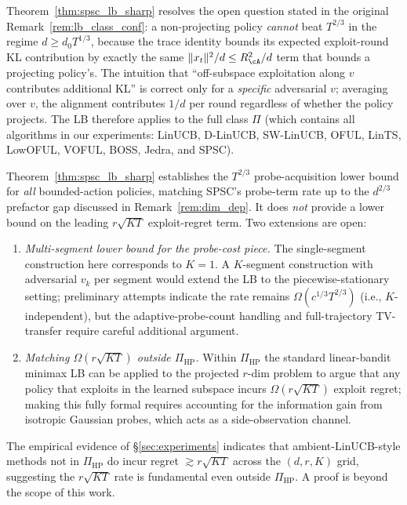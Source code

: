 \begin{remark}
\label{rem:lb_class_resolved}
Theorem~\ref{thm:spsc_lb_sharp} resolves the open question stated in
the original Remark~\ref{rem:lb_class_conf}: a non-projecting policy
\emph{cannot} beat $T^{2/3}$ in the regime $d\ge d_0 T^{1/3}$, because
the trace identity bounds its expected exploit-round KL contribution
by exactly the same $\|x_t\|^2/d\le R_\cA^2/d$ term that bounds a
projecting policy's. The intuition that ``off-subspace exploitation
along $v$ contributes additional KL'' is correct only for a
\emph{specific} adversarial $v$; averaging over $v$, the alignment
contributes $1/d$ per round regardless of whether the policy projects.
The LB therefore applies to the full class $\Pi$ (which contains all
algorithms in our experiments: LinUCB, D-LinUCB, SW-LinUCB, OFUL,
LinTS, LowOFUL, VOFUL, BOSS, Jedra, and SPSC).
\end{remark}

\begin{remark}
\label{rem:open_multiseg}
Theorem~\ref{thm:spsc_lb_sharp} establishes the $T^{2/3}$
probe-acquisition lower bound for \emph{all} bounded-action policies,
matching SPSC's probe-term rate up to the $d^{2/3}$ prefactor gap
discussed in Remark~\ref{rem:dim_dep}. It does \emph{not} provide a
lower bound on the leading $r\sqrt{KT}$ exploit-regret term. Two
extensions are open:
\begin{enumerate}
\item \emph{Multi-segment lower bound for the probe-cost piece.} The
single-segment construction here corresponds to $K=1$. A $K$-segment
construction with adversarial $v_k$ per segment would extend the LB
to the piecewise-stationary setting; preliminary attempts indicate the
rate remains $\Omega(c^{1/3}T^{2/3})$ (i.e., $K$-independent), but the
adaptive-probe-count handling and full-trajectory TV-transfer require
careful additional argument.
\item \emph{Matching $\Omega(r\sqrt{KT})$ outside $\Pi_{\mathrm{HP}}$.}
Within $\Pi_{\mathrm{HP}}$ the standard linear-bandit minimax LB
\citep[Theorem~24.2]{lattimore2020bandit} can be applied to the
projected $r$-dim problem to argue that any policy that exploits in
the learned subspace incurs $\Omega(r\sqrt{KT})$ exploit regret;
making this fully formal requires accounting for the information gain
from isotropic Gaussian probes, which acts as a side-observation
channel.
\end{enumerate}
The empirical evidence of \S\ref{sec:experiments} indicates that
ambient-LinUCB-style methods not in $\Pi_{\mathrm{HP}}$ do incur
regret $\gtrsim r\sqrt{KT}$ across the $(d,r,K)$ grid, suggesting the
$r\sqrt{KT}$ rate is fundamental even outside $\Pi_{\mathrm{HP}}$.
A proof is beyond the scope of this work.
\end{remark}


